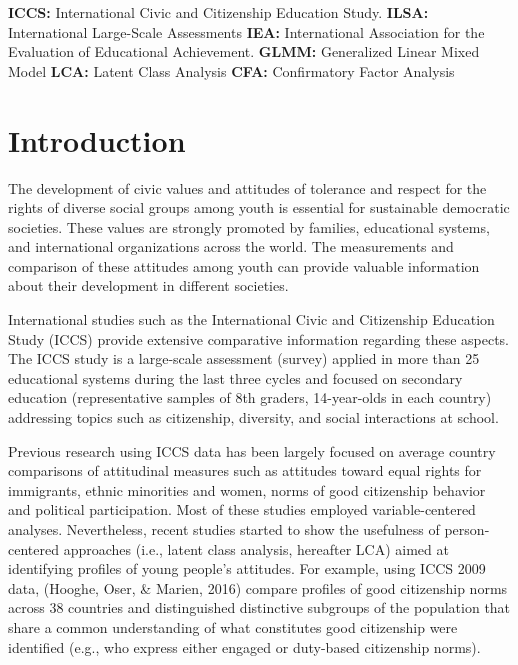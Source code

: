 \documentclass[12pt,a4paper,oneside]{reedthesis}
\begin{document}
  \begin{listabbrev}
    \textbf{ICCS:} International Civic and Citizenship Education Study. \newline
    \textbf{ILSA:} International Large-Scale Assessments \newline
    \textbf{IEA:} International Association for the Evaluation of Educational Achievement. \newline
    \textbf{GLMM:} Generalized Linear Mixed Model \newline
    \textbf{LCA:} Latent Class Analysis \newline
    \textbf{CFA:} Confirmatory Factor Analysis \newline
  \end{listabbrev}
  \hypersetup{linkcolor=black}
  \setcounter{secnumdepth}{2}
  \setcounter{tocdepth}{2}
  \tableofcontents


  \listoftables

  \listoffigures


\mainmatter %
\pagestyle{fancyplain} %

\hypertarget{introduction}{%
\chapter{Introduction}\label{introduction}}

The development of civic values and attitudes of tolerance and respect for the rights of diverse social groups among youth is essential for sustainable democratic societies. These values are strongly promoted by families, educational systems, and international organizations across the world. The measurements and comparison of these attitudes among youth can provide valuable information about their development in different societies.

International studies such as the International Civic and Citizenship Education Study (ICCS) provide extensive comparative information regarding these aspects. The ICCS study is a large-scale assessment (survey) applied in more than 25 educational systems during the last three cycles and focused on secondary education (representative samples of 8th graders, 14-year-olds in each country) addressing topics such as citizenship, diversity, and social interactions at school.

Previous research using ICCS data has been largely focused on average country comparisons of attitudinal measures such as attitudes toward equal rights for immigrants, ethnic minorities and women, norms of good citizenship behavior and political participation. Most of these studies employed variable-centered analyses. Nevertheless, recent studies started to show the usefulness of person-centered approaches (i.e., latent class analysis, hereafter LCA) aimed at identifying profiles of young people's attitudes. For example, using ICCS 2009 data, (Hooghe, Oser, \& Marien, 2016) compare profiles of good citizenship norms across 38 countries and distinguished distinctive subgroups of the population that share a common understanding of what constitutes good citizenship were identified (e.g., who express either engaged or duty-based citizenship norms).
\end{document}
